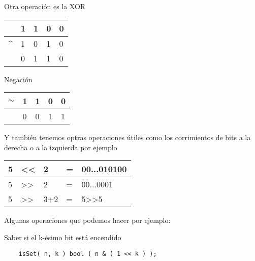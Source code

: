 Otra operación es la XOR 
\begin{longtable}[c]{lllll}
    \rowcolor[HTML]{FFFFFF} 
                                              & 1                        & 1                        & 0 & 0 \\
    \endfirsthead
    \endhead
    \rowcolor[HTML]{FFFFFF} 
    {\color[HTML]{333333} \textasciicircum{}} & {\color[HTML]{333333} 1} & {\color[HTML]{333333} 0} & 1 & 0 \\
    \rowcolor[HTML]{C0C0C0} 
                                              & 0                        & 1                        & 1 & 0
\end{longtable}

Negación 

\begin{longtable}[c]{lllll}
    \rowcolor[HTML]{FFFFFF} 
    $\sim$                  & 1                        & 1                        & 0 & 0 \\
    \endfirsthead
    \endhead
    \rowcolor[HTML]{C0C0C0} 
    {\color[HTML]{333333} } & {\color[HTML]{333333} 0} & {\color[HTML]{333333} 0} & 1 & 1
\end{longtable}

Y también tenemos optras operaciones útiles como los corrimientos de bits a la derecha o a la izquierda por ejemplo

\begin{longtable}[c]{lllll}
    \rowcolor[HTML]{FFFFFF} 
    5                        & \textless{}\textless{}                              & 2                        & = & 00...010100                    \\
    \endfirsthead
    \endhead
    \rowcolor[HTML]{FFFFFF} 
    {\color[HTML]{333333} 5} & {\color[HTML]{333333} \textgreater{}\textgreater{}} & {\color[HTML]{333333} 2} & = & 00...0001                      \\
    5                        & \textgreater{}\textgreater{}                        & 3+2                      & = & 5\textgreater{}\textgreater{}5
\end{longtable}

Algunas operaciones que podemos hacer por ejemplo: \newline 

Saber si el k-ésimo bit está encendido 
\begin{lstlisting}
    isSet( n, k ) bool ( n & ( 1 << k ) );
\end{lstlisting}

